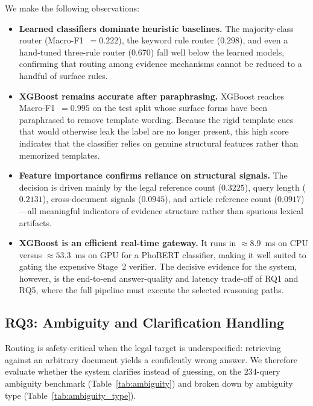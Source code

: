 ﻿\documentclass[11pt,twocolumn]{article}
\begin{document}
We make the following observations:
\begin{itemize}
  \item \textbf{Learned classifiers dominate heuristic baselines.} The
  majority-class router (Macro-F1~$=0.222$), the keyword rule router
  ($0.298$), and even a hand-tuned three-rule router ($0.670$) fall well
  below the learned models, confirming that routing among evidence
  mechanisms cannot be reduced to a handful of surface rules.

  \item \textbf{XGBoost remains accurate after paraphrasing.} XGBoost
  reaches Macro-F1~$=0.995$ on the test split whose surface forms have
  been paraphrased to remove template wording. Because the rigid template
  cues that would otherwise leak the label are no longer present, this
  high score indicates that the classifier relies on genuine structural
  features rather than memorized templates.

  \item \textbf{Feature importance confirms reliance on structural
  signals.} The decision is driven mainly by the legal reference count
  ($0.3225$), query length ($0.2131$), cross-document signals ($0.0945$),
  and article reference count ($0.0917$)---all meaningful indicators of
  evidence structure rather than spurious lexical artifacts.

  \item \textbf{XGBoost is an efficient real-time gateway.} It runs in
  $\approx\!8.9$~ms on CPU versus $\approx\!53.3$~ms on GPU for a PhoBERT
  classifier, making it well suited to gating the expensive Stage~2
  verifier. The decisive evidence for the system, however, is the
  end-to-end answer-quality and latency trade-off of RQ1 and RQ5, where
  the full pipeline must execute the selected reasoning paths.
\end{itemize}

\subsection{RQ3: Ambiguity and Clarification Handling}
\label{subsec:rq3}

Routing is safety-critical when the legal target is underspecified:
retrieving against an arbitrary document yields a confidently wrong
answer. We therefore evaluate whether the system clarifies instead of
guessing, on the $234$-query ambiguity benchmark
(Table~\ref{tab:ambiguity}) and broken down by ambiguity type
(Table~\ref{tab:ambiguity_type}).
\end{document}
